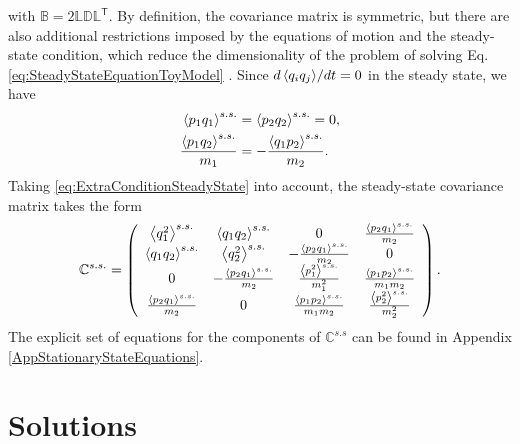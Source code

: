 %
with $\mathbb{B} = 2 \mathbb{L}\mathbb{D}\mathbb{L}^\mathsf{T}$. By definition, the covariance matrix is  symmetric, but there are also  additional restrictions imposed by the equations of motion and the steady-state condition, which reduce the dimensionality of the problem of solving Eq. \eqref{eq:SteadyStateEquationToyModel} \cite{Simon2019}. Since ${d \expval{ q_i q_j }}/{dt} = 0$ in the steady state, we have
%
\begin{align}
  \expval{ p_1 q_1}^{s.s.} &= \expval{ p_2 q_2}^{s.s.} = 0,\nonumber\\
  \frac{\expval{ p_1 q_2}^{s.s.}}{m_1}&=-\frac{\expval{ q_1 p_2}^{s.s.}}{m_2}.
  \label{eq:ExtraConditionSteadyState}
\end{align}
%
Taking \eqref{eq:ExtraConditionSteadyState} into account, the steady-state covariance matrix takes the form
%
\begin{equation}
  \begin{split}
    \mathbb{C}^{s.s.} =
    \left(
    \begin{array}{cccc}
      \expval{ q_1^2}^{s.s.}  & \expval{ q_1 q_2}^{s.s.}  & 0 & \frac{\expval{ p_2 q_1}^{s.s.} }{m_2} \\
      \expval{ q_1 q_2}^{s.s.}  & \expval{ q_2^2}^{s.s.}  & -\frac{\expval{ p_2 q_1}^{s.s.} }{m_2} & 0 \\
      0 & -\frac{\expval{ p_2 q_1}^{s.s.} }{m_2} & \frac{\expval{ p_1^2}^{s.s.} }{m_1^2} & \frac{\expval{ p_1 p_2}^{s.s.} }{m_1 m_2} \\
      \frac{\expval{ p_2 q_1}^{s.s.} }{m_2} & 0 & \frac{\expval{ p_1 p_2}^{s.s.} }{m_1 m_2} & \frac{\expval{ p_2^2}^{s.s.} }{m_2^2} \\
      \end{array}
      \right)
    \end{split}
    \label{eq:steadyStateCovarianceMatrix}\,.
\end{equation}
%
The explicit set of equations for the components of $\mathbb{C}^{s.s}$ can be found in Appendix \ref{AppStationaryStateEquations}.
%
%
%
%
%
\section{Solutions\label{sec:solutions}}
%
%
%
%

